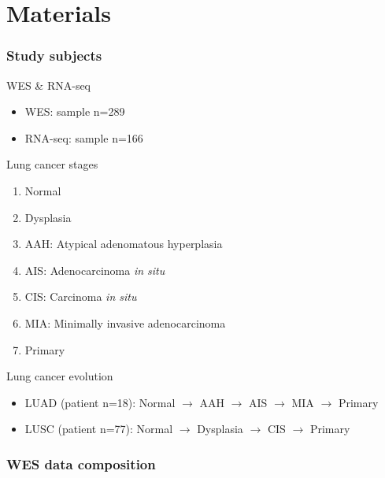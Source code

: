 \documentclass{beamer}
\begin{document}
    \section{Materials}
        \begin{frame}[allowframebreaks]
            \frametitle{Study subjects}

            \begin{block}{WES \& RNA-seq}
                \begin{itemize}
                    \item WES: sample n=289
                    \item RNA-seq: sample n=166
                \end{itemize}
            \end{block}

            \begin{block}{Lung cancer stages}
                \begin{enumerate}
                    \item Normal
                    \item Dysplasia
                    \item AAH: Atypical adenomatous hyperplasia
                    \item AIS: Adenocarcinoma \textit{in situ}
                    \item CIS: Carcinoma \textit{in situ}
                    \item MIA: Minimally invasive adenocarcinoma
                    \item Primary
                \end{enumerate}
            \end{block}

            \begin{block}{Lung cancer evolution}
                \begin{itemize}
                    \item LUAD (patient n=18): Normal $\rightarrow$ AAH $\rightarrow$ AIS $\rightarrow$ MIA $\rightarrow$ Primary
                    \item LUSC (patient n=77): Normal $\rightarrow$ Dysplasia $\rightarrow$ CIS $\rightarrow$ Primary
                \end{itemize}
            \end{block}
        \end{frame}

        \begin{frame}
            \frametitle{WES data composition}

            \begin{table}
                \caption{Number of WES samples}
                \resizebox{!}{0.3 \textheight}
                {}
            \end{table}
        \end{frame}
\end{document}
